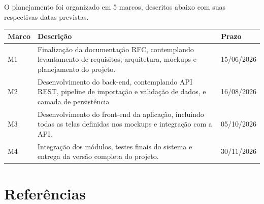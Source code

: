 \documentclass[12pt,a4paper]{article}
\begin{document}
O planejamento foi organizado em 5 marcos, descritos abaixo com suas respectivas datas previstas.

\begin{center}
    \begin{tabular}{p{} p{} p{}}
        \toprule
        \textbf{Marco} & \textbf{Descrição}                                                                                                        & \textbf{Prazo} \\
        \midrule
        M1             & Finalização da documentação RFC, contemplando levantamento de requisitos, arquitetura, mockups e planejamento do projeto. & 15/06/2026     \\
        \midrule
        M2             & Desenvolvimento do back-end, contemplando API REST, pipeline de importação e validação de dados, e camada de persistência & 16/08/2026     \\
        \midrule
        M3             & Desenvolvimento do front-end da aplicação, incluindo todas as telas definidas nos mockups e integração com a API.         & 05/10/2026     \\
        \midrule
        M4             & Integração dos módulos, testes finais do sistema e entrega da versão completa do projeto.                                 & 30/11/2026     \\
        \bottomrule
    \end{tabular}
\end{center}

\section{Referências}
\end{document}

